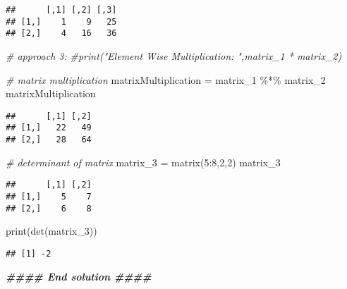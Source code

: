 \documentclass[
]{article}
\newenvironment{Shaded}{\begin{snugshade}}{\end{snugshade}}
\newcommand{\CommentTok}[1]{\textcolor[rgb]{0.56,0.35,0.01}{\textit{#1}}}
\newcommand{\DecValTok}[1]{\textcolor[rgb]{0.00,0.00,0.81}{#1}}
\newcommand{\DocumentationTok}[1]{\textcolor[rgb]{0.56,0.35,0.01}{\textbf{\textit{#1}}}}
\newcommand{\FunctionTok}[1]{\textcolor[rgb]{0.00,0.00,0.00}{#1}}
\newcommand{\NormalTok}[1]{#1}
\newcommand{\OtherTok}[1]{\textcolor[rgb]{0.56,0.35,0.01}{#1}}
\newcommand{\SpecialCharTok}[1]{\textcolor[rgb]{0.00,0.00,0.00}{#1}}
\begin{document}
\begin{verbatim}
##      [,1] [,2] [,3]
## [1,]    1    9   25
## [2,]    4   16   36
\end{verbatim}

\begin{Shaded}
\begin{Highlighting}[]
\CommentTok{\# approach 3:}
\CommentTok{\#print("Element Wise Multiplication: ",matrix\_1 * matrix\_2)}
\end{Highlighting}
\end{Shaded}

\begin{Shaded}
\begin{Highlighting}[]
\CommentTok{\# matrix multiplication}
\NormalTok{matrixMultiplication }\OtherTok{=}\NormalTok{ matrix\_1 }\SpecialCharTok{\%*\%}\NormalTok{ matrix\_2}
\NormalTok{matrixMultiplication}
\end{Highlighting}
\end{Shaded}

\begin{verbatim}
##      [,1] [,2]
## [1,]   22   49
## [2,]   28   64
\end{verbatim}

\begin{Shaded}
\begin{Highlighting}[]
\CommentTok{\# determinant of matrix}
\NormalTok{matrix\_3 }\OtherTok{=} \FunctionTok{matrix}\NormalTok{(}\DecValTok{5}\SpecialCharTok{:}\DecValTok{8}\NormalTok{,}\DecValTok{2}\NormalTok{,}\DecValTok{2}\NormalTok{)}
\NormalTok{matrix\_3}
\end{Highlighting}
\end{Shaded}

\begin{verbatim}
##      [,1] [,2]
## [1,]    5    7
## [2,]    6    8
\end{verbatim}

\begin{Shaded}
\begin{Highlighting}[]
\FunctionTok{print}\NormalTok{(}\FunctionTok{det}\NormalTok{(matrix\_3))}
\end{Highlighting}
\end{Shaded}

\begin{verbatim}
## [1] -2
\end{verbatim}

\begin{Shaded}
\begin{Highlighting}[]
\DocumentationTok{\#\#\#\# End solution \#\#\#\#}
\end{Highlighting}
\end{Shaded}
\end{document}
